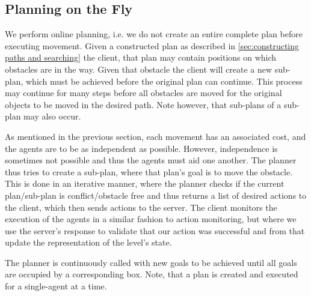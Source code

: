 \subsection{Planning on the Fly}
\label{sec:planning on the fly}

We perform online planning, i.e. we do not create an entire complete plan before executing movement.
Given a constructed plan as described in \cref{sec:constructing paths and searching} the client, that plan may contain positions on which obstacles are in the way.
Given that obstacle the client will create a new sub-plan, which must be achieved before the original plan can continue.
This process may continue for many steps before all obstacles are moved for the original objects to be moved in the desired path.
Note however, that sub-plans of a sub-plan may also occur.

As mentioned in the previous section, each movement has an associated cost, and the agents are to be as independent as possible.
However, independence is sometimes not possible and thus the agents must aid one another.
The planner thus tries to create a sub-plan, where that plan's goal is to move the obstacle.
This is done in an iterative manner, where the planner checks if the current plan/sub-plan is conflict/obstacle free and thus returns a list of desired actions to the client, which then sends actions to the server.
The client monitors the execution of the agents in a similar fashion to action monitoring, but where we use the server's response to validate that our action was successful and from that update the representation of the level's state.

The planner is continuously called with new goals to be achieved until all goals are occupied by a corresponding box.
Note, that a plan is created and executed for a single-agent at a time.
